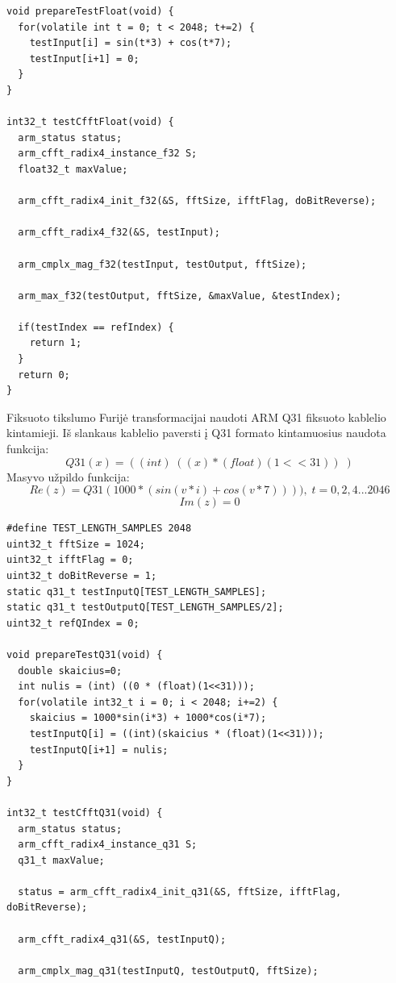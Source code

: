 \documentclass[a4paper, 12pt]{article} %
\begin{document}
\begin{onehalfspacing}
\begin{verbatim}
void prepareTestFloat(void) {
  for(volatile int t = 0; t < 2048; t+=2) {
    testInput[i] = sin(t*3) + cos(t*7);
    testInput[i+1] = 0;
  }
}

int32_t testCfftFloat(void) { 
  arm_status status; 
  arm_cfft_radix4_instance_f32 S; 
  float32_t maxValue;  
   
  arm_cfft_radix4_init_f32(&S, fftSize, ifftFlag, doBitReverse); 
   
  arm_cfft_radix4_f32(&S, testInput); 
   
  arm_cmplx_mag_f32(testInput, testOutput, fftSize);  
   
  arm_max_f32(testOutput, fftSize, &maxValue, &testIndex); 
   
  if(testIndex == refIndex) { 
    return 1;
  }
  return 0;
} 
\end{verbatim}  
Fiksuoto tikslumo Furij\.e transformacijai naudoti ARM Q31 fiksuoto kablelio kintamieji. I\v{s} slankaus kablelio paversti \k{i} Q31 formato kintamuosius naudota funkcija:
\begin{equation}
Q31(x)= ((int)\; ((x)*(float)(1<<31))\; )
\end{equation}   
Masyvo u\v{z}pildo funkcija:
\begin{equation*}
Re(z) = Q31(1000*(sin(v*i) + cos(v*7)))),\; t = 0, 2, 4... 2046
\end{equation*}
\begin{equation}
Im(z) = 0
\end{equation}
\begin{verbatim}
#define TEST_LENGTH_SAMPLES 2048
uint32_t fftSize = 1024; 
uint32_t ifftFlag = 0; 
uint32_t doBitReverse = 1; 
static q31_t testInputQ[TEST_LENGTH_SAMPLES]; 
static q31_t testOutputQ[TEST_LENGTH_SAMPLES/2]; 
uint32_t refQIndex = 0;

void prepareTestQ31(void) {
  double skaicius=0;
  int nulis = (int) ((0 * (float)(1<<31)));
  for(volatile int32_t i = 0; i < 2048; i+=2) {
    skaicius = 1000*sin(i*3) + 1000*cos(i*7);
    testInputQ[i] = ((int)(skaicius * (float)(1<<31)));
    testInputQ[i+1] = nulis;
  }
}

int32_t testCfftQ31(void) { 
  arm_status status; 
  arm_cfft_radix4_instance_q31 S; 
  q31_t maxValue; 
   
  status = arm_cfft_radix4_init_q31(&S, fftSize, ifftFlag, doBitReverse); 
   
  arm_cfft_radix4_q31(&S, testInputQ); 
  
  arm_cmplx_mag_q31(testInputQ, testOutputQ, fftSize);  
 

\end{verbatim}
\end{onehalfspacing}
\end{document}
